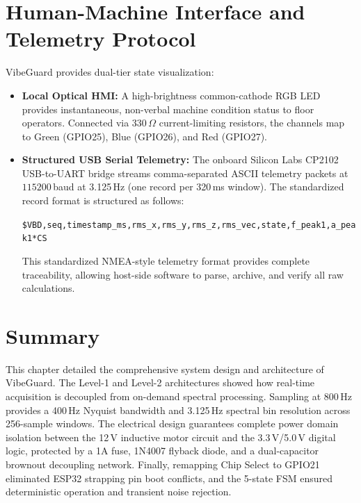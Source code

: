 \section{Human-Machine Interface and Telemetry Protocol}
VibeGuard provides dual-tier state visualization:
\begin{itemize}
    \item \textbf{Local Optical HMI:} A high-brightness common-cathode RGB LED provides instantaneous, non-verbal machine condition status to floor operators. Connected via 330\,$\Omega$ current-limiting resistors, the channels map to Green (GPIO25), Blue (GPIO26), and Red (GPIO27).
    \item \textbf{Structured USB Serial Telemetry:} The onboard Silicon Labs CP2102 USB-to-UART bridge streams comma-separated ASCII telemetry packets at $115200$\,baud at 3.125\,Hz (one record per 320\,ms window). The standardized record format is structured as follows:
    \begin{center}
    \texttt{\$VBD,seq,timestamp\_ms,rms\_x,rms\_y,rms\_z,rms\_vec,state,f\_peak1,a\_peak1*CS}
    \end{center}
    This standardized NMEA-style telemetry format provides complete traceability, allowing host-side software to parse, archive, and verify all raw calculations.
\end{itemize}

\section{Summary}
This chapter detailed the comprehensive system design and architecture of VibeGuard. The Level-1 and Level-2 architectures showed how real-time acquisition is decoupled from on-demand spectral processing. Sampling at 800\,Hz provides a 400\,Hz Nyquist bandwidth and 3.125\,Hz spectral bin resolution across 256-sample windows. The electrical design guarantees complete power domain isolation between the 12\,V inductive motor circuit and the 3.3\,V/5.0\,V digital logic, protected by a 1A fuse, 1N4007 flyback diode, and a dual-capacitor brownout decoupling network. Finally, remapping Chip Select to GPIO21 eliminated ESP32 strapping pin boot conflicts, and the 5-state FSM ensured deterministic operation and transient noise rejection.
